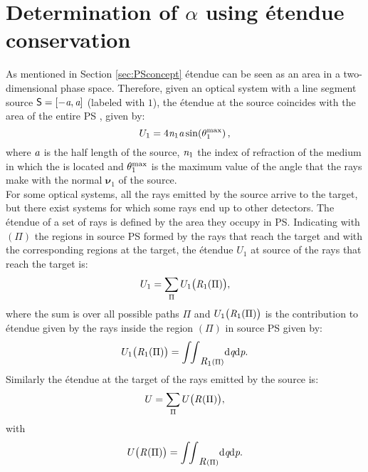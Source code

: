 \section{Determination of $\alpha$ using \'{e}tendue conservation}
As mentioned in Section \ref{sec:PSconcept} \'{e}tendue can be seen as an area in a two-dimensional phase space. 
Therefore, given an optical system with a line segment source $\textsf{S} = [-\textit{a}, \textit{a}]$ (labeled with $1$), the \'{e}tendue at the source coincides with the area of the entire PS , given by:
\begin{equation}\label{eq:etenduesource}
U_1 = 4\textit{n}_1 \textit{a} \sin(\theta_1^{\textrm{max}})\,,
\end{equation}
 where $\textit{a}$ is the half length of the source, $\textit{n}_1$ the index of refraction of the medium in which the  is located and $\theta_1^{\textrm{max}}$ is the maximum value of the angle that the rays make with the normal $\boldsymbol{\nu}_1$ of the source.\\ \indent 
For some optical systems, all the rays emitted by the source arrive to the target, but there exist systems for which some rays end up to other detectors. 
The \'{e}tendue of a set of rays is defined by the area they occupy in PS. Indicating with $(\Pi)$ the regions in source PS formed by the rays that reach the target and with  the corresponding regions at the target, the \'{e}tendue $U_1$ at source of the rays that reach the target is:
\begin{equation}\label{eq:etenduesumsource}
U_1 = \sum_\Pi{U_1\big(\mbox{$\emph{R}_{\textit{$1$}}$}(\Pi)\big)},
\end{equation}
where the sum is over all possible paths $\Pi$ and $U_1\big(\mbox{$\emph{R}_{\textit{$1$}}$}(\Pi)\big)$ is the contribution to \'{e}tendue given by the rays inside the region 
$(\Pi)$ in source PS given by:
\begin{equation}\label{eq:etendueintegralsource}
U_1\big(\mbox{$\emph{R}_{\textit{$1$}}$}(\Pi)\big) = {\int\!\!\int}_{\mbox{$\emph{R}_{\textit{$1$}}$}(\Pi)} \textrm{d}\textit{q}\textrm{d}\textit{p}.
\end{equation}
Similarly the \'{e}tendue at the target of the rays emitted by the source is:
\begin{equation}
U= \sum_\Pi{U\big(\mbox{$\emph{R}_{\textit{}}$}(\Pi)\big)},
\end{equation}
with
\begin{equation}\label{eq:etendueintegraltarget}
U\big(\mbox{$\emph{R}_{\textit{}}$}(\Pi)\big) = {\int\!\!\int}_{\mbox{$\emph{R}_{\textit{}}$}(\Pi)} \textrm{d}\textit{q}\textrm{d}\textit{p}.
\end{equation}

